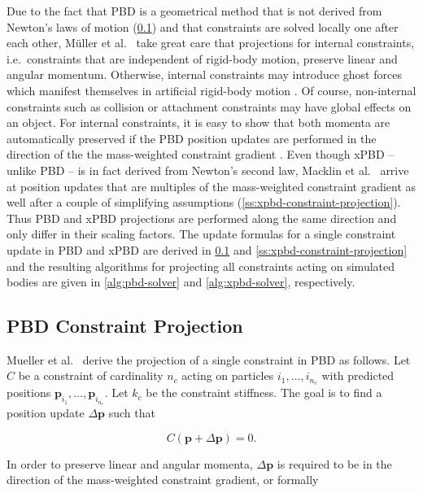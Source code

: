 Due to the fact that PBD is a geometrical method that is not derived from Newton's laws of motion (\cref{ss:pbd-constraint-projection}) and that 
constraints are solved locally one after each 
other, Müller et al.\ \cite{mueller2006} take great care that projections for internal constraints, i.e.\ constraints that are independent of rigid-body 
motion, preserve linear and angular momentum. Otherwise, internal constraints may introduce ghost forces which manifest themselves in artificial 
rigid-body motion \cite{mueller2006}. Of course, non-internal constraints such as collision or 
attachment constraints may have global effects on an object. For internal constraints, it is easy to show that both momenta are automatically preserved 
if the PBD position updates are performed in the direction of the the mass-weighted constraint gradient \cite{mueller2006}. Even though xPBD -- unlike 
PBD -- is in fact derived from Newton's second law, Macklin et al.\ \cite{macklin2016} arrive at position updates that are multiples of the mass-weighted 
constraint gradient as well after a couple of simplifying assumptions (\cref{ss:xpbd-constraint-projection}). Thus PBD and xPBD projections 
are performed along the same direction and only differ in their scaling factors. The update formulas for a single constraint update in PBD and xPBD are 
derived in \cref{ss:pbd-constraint-projection} and \cref{ss:xpbd-constraint-projection} and the resulting algorithms for projecting all constraints 
acting on simulated bodies are given in \cref{alg:pbd-solver} and \cref{alg:xpbd-solver}, respectively.

\subsection{PBD Constraint Projection}\label{ss:pbd-constraint-projection}

Mueller et al.\ \cite{mueller2006} derive the projection of a single constraint in PBD as follows. Let $C$ be a constraint of cardinality $n_c$ 
acting on particles $i_1, \ldots, i_{n_c}$ with predicted positions $\bm{p}_{i_1}, \ldots, \bm{p}_{i_{n_c}}$. Let $k_c$ be the constraint 
stiffness. The goal is to find a position update $\Delta \bm{p}$ such that 

\begin{equation}\label{eq:pbd-delta}
    C(\bm{p} + \Delta \bm{p}) = 0.
\end{equation}

\noindent In order to preserve linear and angular momenta, $\Delta \bm{p}$ is required to be in the direction of the mass-weighted constraint 
gradient, or formally

